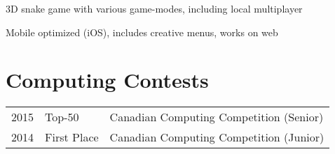 \documentclass[]{deedy-resume-openfont}
\begin{document}
\begin{minipage}[t]{0.66\textwidth}

\begin{tightemize}
\item 3D snake game with various game-modes, including local multiplayer\\
\item Mobile optimized (iOS), includes creative menus, works on web\\
\end{tightemize}
\sectionsep





\section{Computing Contests} 
\begin{tabular}{rll}
2015	     & Top-50 & Canadian Computing Competition (Senior)\\
2014	     & First Place  & Canadian Computing Competition (Junior)\\


\end{tabular}
\end{minipage}
\end{document}
